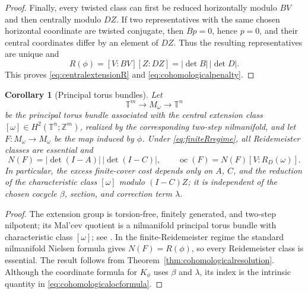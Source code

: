 \documentclass[11pt]{article}
\newtheorem{corollary}[theorem]{Corollary}
\DeclareMathOperator{\oc}{oc}
\newcommand{\Z}{\mathbb Z}
\newcommand{\T}{\mathbb T}
\begin{document}
\begin{proof}
Finally, every twisted class can first be reduced horizontally modulo $BV$
and then centrally modulo $DZ$.  If two representatives with the same chosen
horizontal coordinate are twisted conjugate, then $Bp=0$, hence $p=0$, and
their central coordinates differ by an element of $DZ$.  Thus the resulting
representatives are unique and
\[
  R(\phi)=[V:BV][Z:DZ]=|\det B|\,|\det D|.
\]
This proves \eqref{eq:centralextensionR} and
\eqref{eq:cohomologicalpenalty}.
\end{proof}

\begin{corollary}[Principal torus bundles]
\label{cor:torusbundleoc}
Let
\[
  \T^m\longrightarrow M_\omega\longrightarrow\T^n
\]
be the principal torus bundle associated with the central extension class
$[\omega]\in H^2(\T^n;\Z^m)$, realized by the corresponding two-step
nilmanifold, and let $F\colon M_\omega\to M_\omega$ be the map induced by
$\phi$.  Under \eqref{eq:finiteRregime}, all Reidemeister classes are essential
and
\begin{equation}
  \boxed{
  N(F)=|\det(I-A)|\,|\det(I-C)|,
  \qquad
  \oc(F)=N(F)[V:R_D(\omega)].}
  \label{eq:torusbundleoc}
\end{equation}
In particular, the excess finite-cover cost depends only on $A$, $C$, and the
reduction of the characteristic class $[\omega]$ modulo $(I-C)Z$; it is
independent of the chosen cocycle $\beta$, section, and correction term
$\lambda$.
\end{corollary}

\begin{proof}
The extension group is torsion-free, finitely generated, and two-step
nilpotent; its Mal'cev quotient is a nilmanifold principal torus bundle with
characteristic class $[\omega]$; see
\cite{DekimpeBook,PalaisStewart,Raghunathan}.  In the finite-Reidemeister
regime the standard nilmanifold Nielsen formula gives
$N(F)=R(\phi)$, so every Reidemeister class is essential.  The result follows
from Theorem~\ref{thm:cohomologicalresolution}.  Although the coordinate
formula for $K_\phi$ uses $\beta$ and $\lambda$, its index is the intrinsic
quantity in \eqref{eq:cohomologicalocformula}.
\end{proof}
\end{document}
